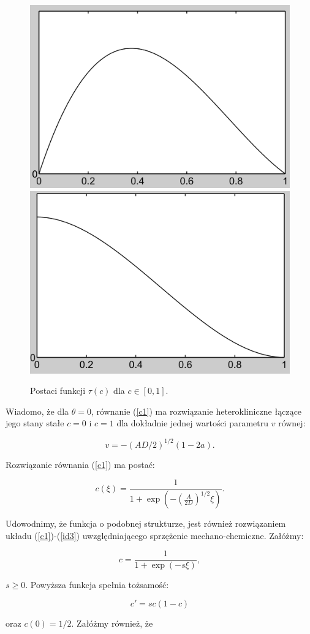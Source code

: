 \begin{figure} 
	\includegraphics[width=0.49\linewidth]{rysunki/rozdzial_3/taumaj1.png} 
	\includegraphics[width=0.493\linewidth]{rysunki/rozdzial_3/taumaj2.png} \\
	\caption[Postaci funkcji $\tau(c)$]{Postaci funkcji $\tau(c)$ dla $c \in [0,1]$.} \label{fig2}
\end{figure} 

Wiadomo, że dla $\theta = 0$, równanie (\ref{c1}) ma rozwiązanie heterokliniczne łączące jego stany stałe $c=0$ i $c=1$ dla dokładnie jednej wartości parametru $v$ równej: 

\[ v = - (AD/2)^{1/2} ( 1 - 2 a). \]

\noindent Rozwiązanie równania (\ref{c1}) ma postać: 

\[ c(\xi) = \frac{1}{1+\exp( -(\frac{A}{2D})^{1/2} \xi)}. \] 

\noindent Udowodnimy, że funkcja o podobnej strukturze, jest również rozwiązaniem układu (\ref{c1})-(\ref{id3}) uwzględniającego sprzężenie mechano-chemiczne. Załóżmy: 

\begin{equation} \label{ansatz2}
c = \frac{1}{1 + \exp(-s \xi)}, 
\end{equation} 

\noindent $s \geq 0$. Powyższa funkcja spełnia tożsamość: 

\begin{equation} \label{cprim} c' = s c(1-c) \end{equation}  

\noindent oraz $c(0)=1/2$. Załóżmy również, że 


